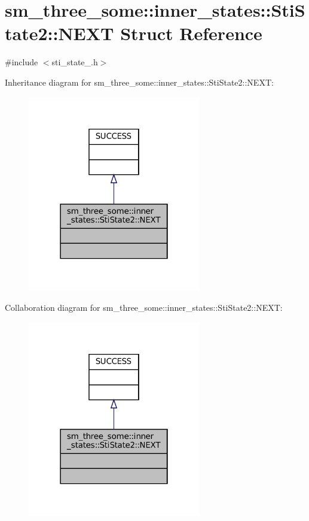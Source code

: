 \hypertarget{structsm__three__some_1_1inner__states_1_1StiState2_1_1NEXT}{}\section{sm\+\_\+three\+\_\+some\+:\+:inner\+\_\+states\+:\+:Sti\+State2\+:\+:N\+E\+XT Struct Reference}
\label{structsm__three__some_1_1inner__states_1_1StiState2_1_1NEXT}


{\ttfamily \#include $<$sti\+\_\+state\+\_.\+h$>$}



Inheritance diagram for sm\+\_\+three\+\_\+some\+:\+:inner\+\_\+states\+:\+:Sti\+State2\+:\+:N\+E\+XT\+:
\nopagebreak
\begin{figure}[H]
\begin{center}
\leavevmode
\includegraphics[width=214pt]{structsm__three__some_1_1inner__states_1_1StiState2_1_1NEXT__inherit__graph}
\end{center}
\end{figure}


Collaboration diagram for sm\+\_\+three\+\_\+some\+:\+:inner\+\_\+states\+:\+:Sti\+State2\+:\+:N\+E\+XT\+:
\nopagebreak
\begin{figure}[H]
\begin{center}
\leavevmode
\includegraphics[width=214pt]{structsm__three__some_1_1inner__states_1_1StiState2_1_1NEXT__coll__graph}
\end{center}
\end{figure}



